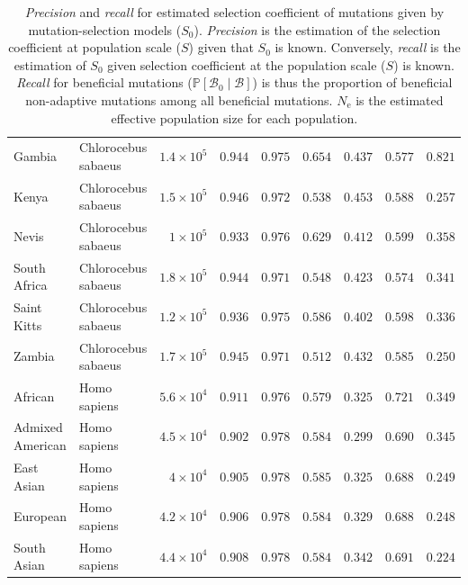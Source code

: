 \documentclass{article}
\newcommand{\Ne}{N_{\text{e}}}
\newcommand{\proba}{\mathbb{P}}
\newcommand{\Sphy}{S_{0}}
\newcommand{\SphyBen}{\mathcal{B}_0}
\newcommand{\given}{\mid}
\newcommand{\Spop}{S}
\newcommand{\SpopBen}{\mathcal{B}}
\begin{document}
\begin{table}[tb]
\begin{adjustbox}{width=\textwidth}
\begin{tabular}{||l|l|r||r|r||r|r||r|r||}
                \rowcolor{LIGHTGREY} Gambia & Chlorocebus sabaeus & $1.4\times 10^{5}$ & $ 0.944$ & $ 0.975$ & $ 0.654$ & $ 0.437$ & $ 0.577$ & $ 0.821$ \\
                \rowcolor{LIGHTGREY} Kenya & Chlorocebus sabaeus & $1.5\times 10^{5}$ & $ 0.946$ & $ 0.972$ & $ 0.538$ & $ 0.453$ & $ 0.588$ & $ 0.257$ \\
                \rowcolor{LIGHTGREY} Nevis & Chlorocebus sabaeus & $ 1\times 10^{5}$ & $ 0.933$ & $ 0.976$ & $ 0.629$ & $ 0.412$ & $ 0.599$ & $ 0.358$ \\
                \rowcolor{LIGHTGREY} South Africa & Chlorocebus sabaeus & $1.8\times 10^{5}$ & $ 0.944$ & $ 0.971$ & $ 0.548$ & $ 0.423$ & $ 0.574$ & $ 0.341$ \\
                \rowcolor{LIGHTGREY} Saint Kitts & Chlorocebus sabaeus & $1.2\times 10^{5}$ & $ 0.936$ & $ 0.975$ & $ 0.586$ & $ 0.402$ & $ 0.598$ & $ 0.336$ \\
                \rowcolor{LIGHTGREY} Zambia & Chlorocebus sabaeus & $1.7\times 10^{5}$ & $ 0.945$ & $ 0.971$ & $ 0.512$ & $ 0.432$ & $ 0.585$ & $ 0.250$ \\
                African & Homo sapiens & $5.6\times 10^{4}$ & $ 0.911$ & $ 0.976$ & $ 0.579$ & $ 0.325$ & $ 0.721$ & $ 0.349$ \\
                Admixed American & Homo sapiens & $4.5\times 10^{4}$ & $ 0.902$ & $ 0.978$ & $ 0.584$ & $ 0.299$ & $ 0.690$ & $ 0.345$ \\
                East Asian & Homo sapiens & $ 4\times 10^{4}$ & $ 0.905$ & $ 0.978$ & $ 0.585$ & $ 0.325$ & $ 0.688$ & $ 0.249$ \\
                European & Homo sapiens & $4.2\times 10^{4}$ & $ 0.906$ & $ 0.978$ & $ 0.584$ & $ 0.329$ & $ 0.688$ & $ 0.248$ \\
                South Asian & Homo sapiens & $4.4\times 10^{4}$ & $ 0.908$ & $ 0.978$ & $ 0.584$ & $ 0.342$ & $ 0.691$ & $ 0.224$ \\
                \bottomrule
            \end{tabular}
        \end{adjustbox}
        \caption{
            \textit{Precision} and \textit{recall} for estimated selection coefficient of mutations given by mutation-selection models ($\Sphy$).
            \textit{Precision} is the estimation of the selection coefficient at population scale ($\Spop$) given that $\Sphy$ is known.
            Conversely, \textit{recall} is the estimation of $\Sphy$ given selection coefficient at the population scale ($\Spop$) is known.
            \textit{Recall} for beneficial mutations ($\proba [\SphyBen \given \SpopBen]$) is thus the proportion of beneficial non-adaptive mutations among all beneficial mutations.
            $\Ne$ is the estimated effective population size for each population.
        }
        \label{table:proba}
    \end{table}
\end{document}
